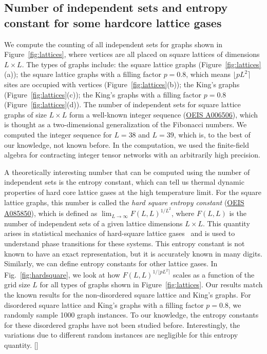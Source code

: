\documentclass[onefignum, onetabnum]{siamart190516}
\newcommand{\<}{\langle}
\renewcommand{\>}{\rangle}
\newcommand{\Fig}[1]{Fig.~\ref{#1}}
\newcommand{\blue}[1]{[{\bf  \color{blue}{JG: #1}}]}
\newcounter{example}
\begin{document}
\subsection{Number of independent sets and entropy constant for some hardcore lattice gases}\label{sec:entropy}
We compute the counting of all independent sets for graphs shown in Figure~\ref{fig:lattices}, where vertices are all placed on square lattices of dimensions $L \times L$.
The types of graphs include: the square lattice graphs (Figure~\ref{fig:lattices}(a)); the square lattice graphs with a filling factor $p=0.8$, which means $\lfloor pL^{2} \rceil$ sites are occupied with vertices  (Figure~\ref{fig:lattices}(b));
the King's graphs  (Figure~\ref{fig:lattices}(c)); the King's graphs with a filling factor $p = 0.8$  (Figure~\ref{fig:lattices}(d)).
The number of independent sets for square lattice graphs of size $L \times L$ form a well-known integer sequence (\href{https://oeis.org/A006506}{OEIS A006506}), which is thought as a two-dimensional generalization of the Fibonacci numbers.
We computed the integer sequence for $L=38$ and $L=39$, which is, to the best of our knowledge, not known before.
In the computation, we used the finite-field algebra for contracting integer tensor networks with an arbitrarily high precision. 

A theoretically interesting number that can be computed using the number of independent sets is the entropy constant, which can tell us thermal dynamic properties of hard core lattice gases at the high temperature limit.
For the square lattice graphs, this number is called the \textit{hard square entropy constant} (\href{https://oeis.org/A085850}{OEIS A085850}), which is defined as $\lim_{L\rightarrow \infty} F(L,L)^{1/L^2}$, where $F(L,L)$ is the number of independent sets of a given lattice dimensions $L \times L$.
This quantity arises in statistical mechanics of hard-square lattice gases~\cite{Baxter1980, Pearce1988} and is used to understand phase transitions for these systems. This entropy constant is not known to have an exact representation, but it is accurately known in many digits. Similarly, we can define entropy constants for other lattice gases. In \Fig{fig:hardsquare}, we look at how $F(L,L)^{1/\lfloor pL^2\rceil}$ scales as a function of the grid size $L$ for all types of graphs shown in Figure~\ref{fig:lattices}. Our results match the known results for the non-disordered square lattice and King's graphs. For disordered square lattice and King's graphs with a filling factor $p=0.8$, we randomly sample 1000 graph instances. To our knowledge, the entropy constants for these disordered graphs have not been studied before. Interestingly, the variations due to different random instances are negligible for this entropy quantity. 
\blue{@Shengtao We either keep this example simple by keeping only square and king's graphs, or explain better why we care about entropy constants at filling 0.8.}
\end{document}

